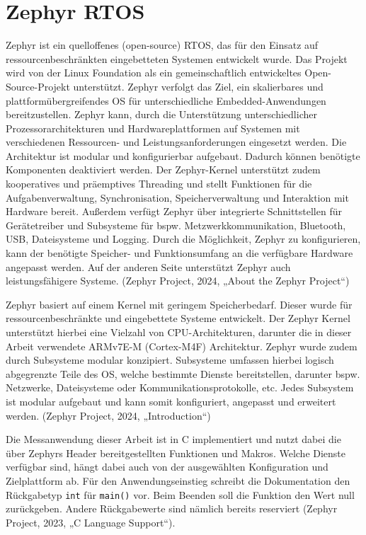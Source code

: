 \section{Zephyr RTOS}
Zephyr ist ein quelloffenes (open-source) RTOS, das für den Einsatz auf ressourcenbeschränkten eingebetteten Systemen entwickelt wurde. Das Projekt wird von der Linux Foundation als ein gemeinschaftlich entwickeltes Open-Source-Projekt unterstützt. Zephyr verfolgt das Ziel, ein skalierbares und plattformübergreifendes OS für unterschiedliche Embedded-Anwendungen bereitzustellen. Zephyr kann, durch die Unterstützung unterschiedlicher Prozessorarchitekturen und Hardwareplattformen auf Systemen mit verschiedenen Ressourcen- und Leistungsanforderungen eingesetzt werden. Die Architektur ist modular und konfigurierbar aufgebaut. Dadurch können benötigte Komponenten deaktiviert werden. Der Zephyr-Kernel unterstützt zudem kooperatives und präemptives Threading und stellt Funktionen für die Aufgabenverwaltung, Synchronisation, Speicherverwaltung und Interaktion mit Hardware bereit. Außerdem verfügt Zephyr über integrierte Schnittstellen für Gerätetreiber und Subsysteme für bspw. Metzwerkkommunikation, Bluetooth, USB, Dateisysteme und Logging. Durch die Möglichkeit, Zephyr zu konfigurieren, kann der benötigte Speicher- und Funktionsumfang an die verfügbare Hardware angepasst werden. Auf der anderen Seite unterstützt Zephyr auch leistungsfähigere Systeme. (Zephyr Project, 2024, „About the Zephyr Project“)

Zephyr basiert auf einem Kernel mit geringem Speicherbedarf. Dieser wurde für ressourcenbeschränkte und eingebettete Systeme entwickelt. Der Zephyr Kernel unterstützt hierbei eine Vielzahl von CPU-Architekturen, darunter die in dieser Arbeit verwendete ARMv7E-M (Cortex-M4F) Architektur. Zephyr wurde zudem durch Subsysteme modular konzipiert. Subsysteme umfassen hierbei logisch abgegrenzte Teile des OS, welche bestimmte Dienste bereitstellen, darunter bspw. Netzwerke, Dateisysteme oder Kommunikationsprotokolle, etc. Jedes Subsystem ist modular aufgebaut und kann somit konfiguriert, angepasst und erweitert werden. (Zephyr Project, 2024, „Introduction“)

Die Messanwendung dieser Arbeit ist in C implementiert und nutzt dabei die über Zephyrs Header bereitgestellten Funktionen und Makros. Welche Dienste verfügbar sind, hängt dabei auch von der ausgewählten Konfiguration und Zielplattform ab. Für den Anwendungseinstieg schreibt die Dokumentation den Rückgabetyp \lstinline[style=fileinline]|int| für \lstinline[style=fileinline]|main()| vor. Beim Beenden soll die Funktion den Wert null zurückgeben. Andere Rückgabewerte sind nämlich bereits reserviert (Zephyr Project, 2023, „C Language Support“).

